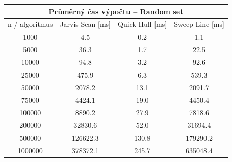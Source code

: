 \documentclass[a4paper, 12pt]{article}
\begin{document}
\begin{table}[]
\centering
\begin{tabular}{|c|c|c|c|}
\hline
\multicolumn{4}{|c|}{\textbf{Průměrný čas výpočtu – Random set}}                  \\ \hline
n / algoritmus & Jarvis Scan {[}ms{]} & Quick Hull {[}ms{]} & Sweep Line {[}ms{]} \\ \hline
1000           & 4.5                  & 0.2                 & 1.1                 \\ \hline
5000           & 36.3                 & 1.7                 & 22.5                \\ \hline
10000          & 94.8                 & 3.2                 & 92.6                \\ \hline
25000          & 475.9                & 6.3                 & 539.3               \\ \hline
50000          & 2078.2               & 13.1                & 2091.7              \\ \hline
75000          & 4424.1               & 19.0                & 4450.4              \\ \hline
100000         & 8890.2               & 27.9                & 7818.6              \\ \hline
200000         & 32830.6              & 52.0                & 31694.4             \\ \hline
500000         & 126622.3             & 130.8               & 179290.2            \\ \hline
1000000        & 378372.1             & 245.7               & 635048.4            \\ \hline
\end{tabular}
\end{table}
\end{document}
